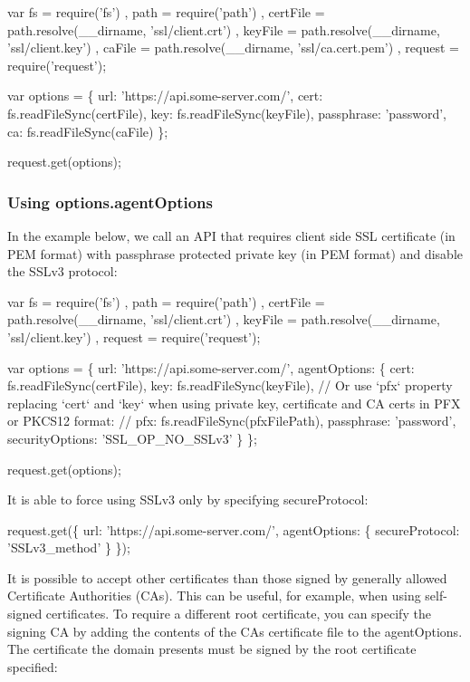 \begin{DoxyCode}
var fs = require('fs')
    , path = require('path')
    , certFile = path.resolve(\_\_dirname, 'ssl/client.crt')
    , keyFile = path.resolve(\_\_dirname, 'ssl/client.key')
    , caFile = path.resolve(\_\_dirname, 'ssl/ca.cert.pem')
    , request = require('request');

var options = \{
    url: 'https://api.some-server.com/',
    cert: fs.readFileSync(certFile),
    key: fs.readFileSync(keyFile),
    passphrase: 'password',
    ca: fs.readFileSync(caFile)
\};

request.get(options);
\end{DoxyCode}


\subsubsection*{Using {\ttfamily options.\+agent\+Options}}

In the example below, we call an A\+PI that requires client side S\+SL certificate (in P\+EM format) with passphrase protected private key (in P\+EM format) and disable the S\+S\+Lv3 protocol\+:


\begin{DoxyCode}
var fs = require('fs')
    , path = require('path')
    , certFile = path.resolve(\_\_dirname, 'ssl/client.crt')
    , keyFile = path.resolve(\_\_dirname, 'ssl/client.key')
    , request = require('request');

var options = \{
    url: 'https://api.some-server.com/',
    agentOptions: \{
        cert: fs.readFileSync(certFile),
        key: fs.readFileSync(keyFile),
        // Or use `pfx` property replacing `cert` and `key` when using private key, certificate and CA
       certs in PFX or PKCS12 format:
        // pfx: fs.readFileSync(pfxFilePath),
        passphrase: 'password',
        securityOptions: 'SSL\_OP\_NO\_SSLv3'
    \}
\};

request.get(options);
\end{DoxyCode}


It is able to force using S\+S\+Lv3 only by specifying {\ttfamily secure\+Protocol}\+:


\begin{DoxyCode}
request.get(\{
    url: 'https://api.some-server.com/',
    agentOptions: \{
        secureProtocol: 'SSLv3\_method'
    \}
\});
\end{DoxyCode}


It is possible to accept other certificates than those signed by generally allowed Certificate Authorities (C\+As). This can be useful, for example, when using self-\/signed certificates. To require a different root certificate, you can specify the signing CA by adding the contents of the CA\textquotesingle{}s certificate file to the {\ttfamily agent\+Options}. The certificate the domain presents must be signed by the root certificate specified\+:


